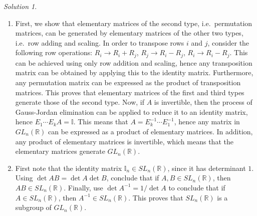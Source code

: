 \documentclass[11pt]{report}
\def\R{\mathbb{R}}
\theoremstyle{remark}
\newtheorem*{solution}{Solution}
\begin{document}
    \begin{solution} \mbox{}
    \begin{enumerate}
        \item First, we show that elementary matrices of the second type, i.e.\
        permutation matrices, can be generated by elementary matrices of the other
        two types, i.e.\ row adding and scaling. In order to transpose rows $i$ and
        $j$, consider the following row operations: $R_i \to R_i + R_j$, $R_j \to
        R_i - R_j$, $R_i \to R_i - R_j$. This can be achieved using only row
        addition and scaling, hence any transposition matrix can be obtained by
        applying this to the identity matrix. Furthermore, any permutation matrix
        can be expressed as the product of transposition matrices. This proves that
        elementary matrices of the first and third types generate those of the
        second type. Now, if $A$ is invertible, then the process of Gauss-Jordan
        elimination can be applied to reduce it to an identity matrix, hence
        $E_1\cdots E_kA = \mathbb{I}$. This means that $A = E_k^{-1} \cdots
        E_1^{-1}$, hence any matrix in $GL_n(\R)$ can be expressed as a product of
        elementary matrices. In addition, any product of elementary matrices is
        invertible, which means that the elementary matrices generate $GL_n(\R)$.

        \item First note that the identity matrix $\mathbb{I}_n \in SL_n(\R)$, since
        it has determinant $1$. Using $\det{AB} = \det{A}\det{B}$, conclude that if
        $A, B \in SL_n(\R)$, then $AB \in SL_n(\R)$. Finally, use $\det{A^{-1}} = 1 /
        \det{A}$ to conclude that if $A \in SL_n(\R)$, then $A^{-1} \in SL_n(\R)$.
        This proves that $SL_n(\R)$ is a subgroup of $GL_n(\R)$.


\end{enumerate}
\end{solution}
\end{document}
